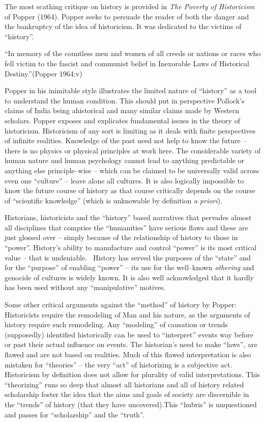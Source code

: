 The most scathing critique on history is provided in \textit{The Poverty of Historicism} of Popper (1964). Popper seeks to persuade the reader of both the danger and the bankruptcy of the idea of historicism. It was dedicated to the victims of “history”.

\begin{myquote}
“In memory of the countless men and women of all creeds or nations or races who fell victim to the fascist and communist belief in Inexorable Laws of Historical Destiny.”\hfill (Popper 1964:v)
\end{myquote}

Popper in his inimitable style illustrates the limited nature of “history” as a tool to understand the human condition. This should put in perspective Pollock’s claims of India being ahistorical and many similar claims made by Western scholars. Popper exposes and explicates fundamental issues in the theory of historicism. Historicism of any sort is limiting as it deals with finite perspectives of infinite realities. Knowledge of the past need not help to know the future – there is no physics or physical principles at work here. The considerable variety of human nature and human psychology cannot lead to anything predictable or anything else principle–wise – which can be claimed to be universally valid across even one “culture” – leave alone all cultures. It is also logically impossible to know the future course of history as that course critically depends on the course of “scientific knowledge” (which is unknowable by definition \textit{a priori}).

Historians, historicists and the “history” based narratives that pervades almost all disciplines that comprise the “humanities” have serious flaws and these are just glossed over – simply because of the relationship of history to those in “power”. History’s ability to manufacture and control “power” is its most critical value – that is undeniable.  History has served the purposes of the “state” and for the “purpose” of enabling “power” – its use for the well–known \textit{othering} and genocide of cultures is widely known. It is also well acknowledged that it hardly has been used without any “manipulative” motives.

Some other critical arguments against the “method” of history by Popper: Historicists require the remodeling of Man and his nature, as the arguments of history require such remodeling. Any “modeling” of causation or trends (supposedly) identified historically can be used to “interpret” events way before or past their actual influence on events. The historian’s need to make “laws”, are flawed and are not based on realities. Much of this flawed interpretation is also mistaken for “theories” – the very “act” of historizing is a subjective act. Historicism by definition does not allow for plurality of valid interpretations. This “theorizing” runs so deep that almost all historians and all of history related scholarship foster the idea that the aims and goals of society are discernible in the “trends” of history (that they have uncovered).This “hubris” is unquestioned and passes for “scholarship” and the “truth”.

